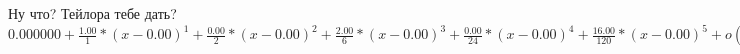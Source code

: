 \documentclass{article}
\begin{document}
Ну что? Тейлора тебе дать?\\$ 0.000000 + \frac{1.00}{1} * {(x-0.00)}^{1} + \frac{0.00}{2} * {(x-0.00)}^{2} + \frac{2.00}{6} * {(x-0.00)}^{3} + \frac{0.00}{24} * {(x-0.00)}^{4} + \frac{16.00}{120} * {(x-0.00)}^{5} + o({x}^{6}) $\\
\end{document}
